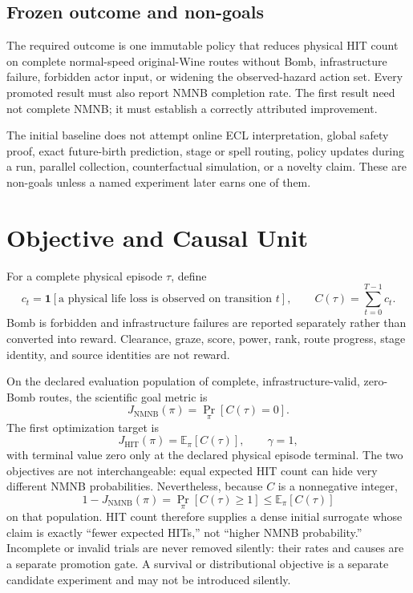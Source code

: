 \documentclass[11pt]{article}
\begin{document}
\subsection{Frozen outcome and non-goals}

The required outcome is one immutable policy that reduces physical HIT count
on complete normal-speed original-Wine routes without Bomb, infrastructure
failure, forbidden actor input, or widening the observed-hazard action set.
Every promoted result must also report NMNB completion rate.  The first result
need not complete NMNB; it must establish a correctly attributed improvement.

The initial baseline does not attempt online ECL interpretation, global safety
proof, exact future-birth prediction, stage or spell routing, policy updates
during a run, parallel collection, counterfactual simulation, or a novelty
claim.  These are non-goals unless a named experiment later earns one of them.

\section{Objective and Causal Unit}

For a complete physical episode $\tau$, define
\begin{equation}
  c_t = \mathbf{1}[\text{a physical life loss is observed on transition }t],
  \qquad
  C(\tau)=\sum_{t=0}^{T-1} c_t.
\end{equation}
Bomb is forbidden and infrastructure failures are reported separately rather
than converted into reward.  Clearance, graze, score, power, rank, route
progress, stage identity, and source identities are not reward.

On the declared evaluation population of complete, infrastructure-valid,
zero-Bomb routes, the scientific goal metric is
\begin{equation}
  J_{\mathrm{NMNB}}(\pi)
  = \Pr_{\pi}[C(\tau)=0].
\end{equation}
The first optimization target is
\begin{equation}
  J_{\mathrm{HIT}}(\pi)=\mathbb{E}_{\pi}[C(\tau)],
  \qquad \gamma=1,
\end{equation}
with terminal value zero only at the declared physical episode terminal.  The
two objectives are not interchangeable: equal expected HIT count can hide very
different NMNB probabilities.  Nevertheless, because $C$ is a nonnegative
integer,
\begin{equation}
  1-J_{\mathrm{NMNB}}(\pi)
  = \Pr_{\pi}[C(\tau)\geq 1]
  \leq \mathbb{E}_{\pi}[C(\tau)]
\end{equation}
on that population.  HIT count therefore supplies a dense initial surrogate
whose claim is exactly ``fewer expected HITs,'' not ``higher NMNB
probability.''  Incomplete or invalid trials are never removed silently: their
rates and causes are a separate promotion gate.  A survival or distributional
objective is a separate candidate experiment and may not be introduced
silently.
\end{document}
